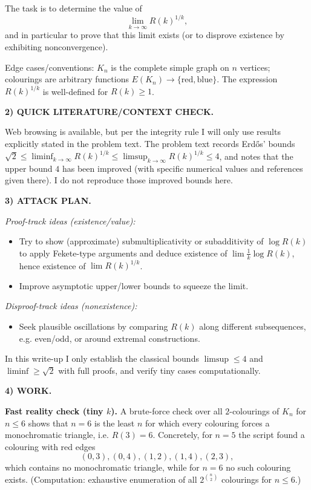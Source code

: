 The task is to determine the value of
\[
\lim_{k\to\infty} R(k)^{1/k},
\]
and in particular to prove that this limit exists (or to disprove existence by exhibiting nonconvergence).

Edge cases/conventions: $K_n$ is the complete simple graph on $n$ vertices; colourings are arbitrary functions $E(K_n)\to\{\text{red},\text{blue}\}$. The expression $R(k)^{1/k}$ is well-defined for $R(k)\ge 1$.

\medskip
\noindent\textbf{2) QUICK LITERATURE/CONTEXT CHECK.}

Web browsing is available, but per the integrity rule I will only use results explicitly stated in the problem text. The problem text records Erd\H{o}s' bounds
\(\sqrt2\le \liminf_{k\to\infty}R(k)^{1/k}\le \limsup_{k\to\infty}R(k)^{1/k}\le 4\), and notes that the upper bound $4$ has been improved (with specific numerical values and references given there). I do not reproduce those improved bounds here.

\medskip
\noindent\textbf{3) ATTACK PLAN.}

\emph{Proof-track ideas (existence/value):}
\begin{itemize}
\item Try to show (approximate) submultiplicativity or subadditivity of $\log R(k)$ to apply Fekete-type arguments and deduce existence of $\lim \frac1k\log R(k)$, hence existence of $\lim R(k)^{1/k}$.
\item Improve asymptotic upper/lower bounds to squeeze the limit.
\end{itemize}
\emph{Disproof-track ideas (nonexistence):}
\begin{itemize}
\item Seek plausible oscillations by comparing $R(k)$ along different subsequences, e.g. even/odd, or around extremal constructions.
\end{itemize}

In this write-up I only establish the classical bounds $\limsup\le 4$ and $\liminf\ge \sqrt2$ with full proofs, and verify tiny cases computationally.

\medskip
\noindent\textbf{4) WORK.}

\noindent\textbf{Fast reality check (tiny $k$).}
A brute-force check over all $2$-colourings of $K_n$ for $n\le 6$ shows that $n=6$ is the least $n$ for which every colouring forces a monochromatic triangle, i.e. $R(3)=6$. Concretely, for $n=5$ the script found a colouring with red edges
\[(0,3),(0,4),(1,2),(1,4),(2,3),\]
which contains no monochromatic triangle, while for $n=6$ no such colouring exists.
(Computation: exhaustive enumeration of all $2^{\binom{n}{2}}$ colourings for $n\le 6$.)

